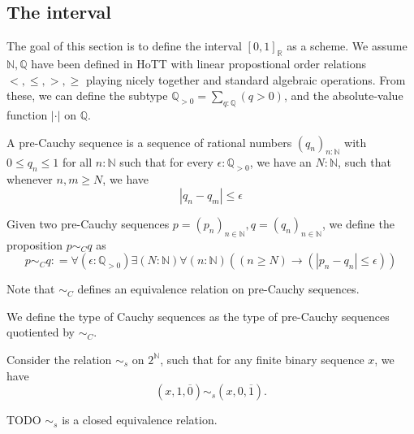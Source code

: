 \newpage
\subsection{The interval}
The goal of this section is to define the interval $[0,1]_\mathbb R$ as a scheme. 
We assume $\mathbb N, \mathbb Q$ have been defined in HoTT
with linear propostional order relations $<,\leq, > ,\geq$ playing nicely together 
and standard algebraic operations. 
From these, we can define the subtype $\mathbb Q_{>0}=\sum_{q : \mathbb Q} (q>0)$, 
and the absolute-value function $|\cdot|$ on $\mathbb Q$. 

\begin{definition}
  A pre-Cauchy sequence is a sequence of rational numbers $(q_n)_{n: \mathbb N}$ with $0 \leq q_n \leq 1$ 
  for all $n:\mathbb N$
  such that for every $\epsilon: \mathbb Q_{>0}$, we have an $N:\mathbb N$, 
  such that whenever $n,m \geq N$, we have 
\begin{equation}
  | q_n - q_m | \leq \epsilon
\end{equation} 
\end{definition}

\begin{definition}
Given two pre-Cauchy sequences $p = (p_n)_{n\in\mathbb N}, q=(q_n)_{n\in\mathbb N}$, 
we define the proposition $p \sim_C  q$ as 
\begin{equation}
  p \sim_C q : = \forall (\epsilon : \mathbb Q_{>0} )\exists ( N :\mathbb N) \forall (n : \mathbb N) ((n \geq N) \to 
  (| p_n - q_n| \leq  \epsilon))
\end{equation}
\end{definition}
Note that $\sim_C$ defines an equivalence relation on pre-Cauchy sequences. 
\begin{definition}
We define the type of Cauchy sequences as the type of pre-Cauchy sequences quotiented by $\sim_C$. 
\end{definition}

%
%
Consider the relation $\sim_s$ on $2^{\mathbb N}$, 
such that for any finite binary sequence $x$, we have 
$$(x,1,\overline 0) \sim_s (x ,0, \overline 1).$$
\begin{lemma}
TODO  $\sim_s$ is a closed equivalence relation. 
\end{lemma}



